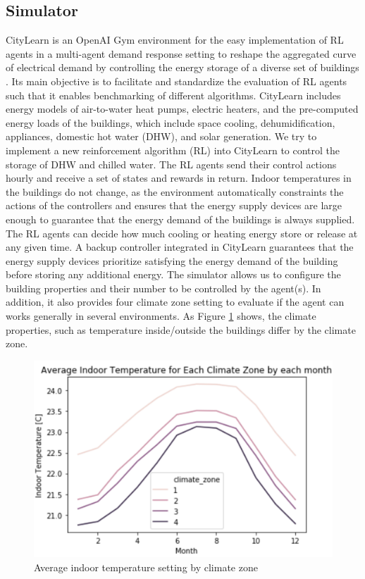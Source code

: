 \documentclass{article}
\begin{document}
\subsection{Simulator}
CityLearn is an OpenAI Gym environment for the easy implementation of RL agents in a multi-agent demand response setting to reshape the aggregated curve of electrical demand by controlling the energy storage of a diverse set of buildings \cite{CityLearn}. Its main objective is to facilitate and standardize the evaluation of RL agents such that it enables benchmarking of different algorithms. CityLearn includes energy models of air-to-water heat pumps, electric heaters, and the pre-computed energy loads of the buildings, which include space cooling, dehumidification, appliances, domestic hot water (DHW), and solar generation. We try to implement a new reinforcement algorithm (RL) into CityLearn to control the storage of DHW and chilled water. The RL agents send their control actions hourly and receive a set of states and rewards in return. Indoor temperatures in the buildings do not change, as the environment automatically constraints the actions of the controllers and ensures that the energy supply devices are large enough to guarantee that the energy demand of the buildings is always supplied. The RL agents can decide how much cooling or heating energy store or release at any given time. A backup controller integrated in CityLearn guarantees that the energy supply devices prioritize satisfying the energy demand of the building before storing any additional energy. The simulator allows us to configure the building properties and their number to be controlled by the agent(s). In addition, it also provides four climate zone setting to evaluate if the agent can works generally in several environments. As Figure \ref{fig:ave_tmp_by_cz} shows, the climate properties, such as temperature inside/outside the buildings differ by the climate zone.

\begin{figure}[h!]
  \centering
  \includegraphics[scale = 0.3]{figures/temp_by_climate_zone.png}
  \caption{Average indoor temperature setting by climate zone}
  \label{fig:ave_tmp_by_cz}
\end{figure}
\end{document}
